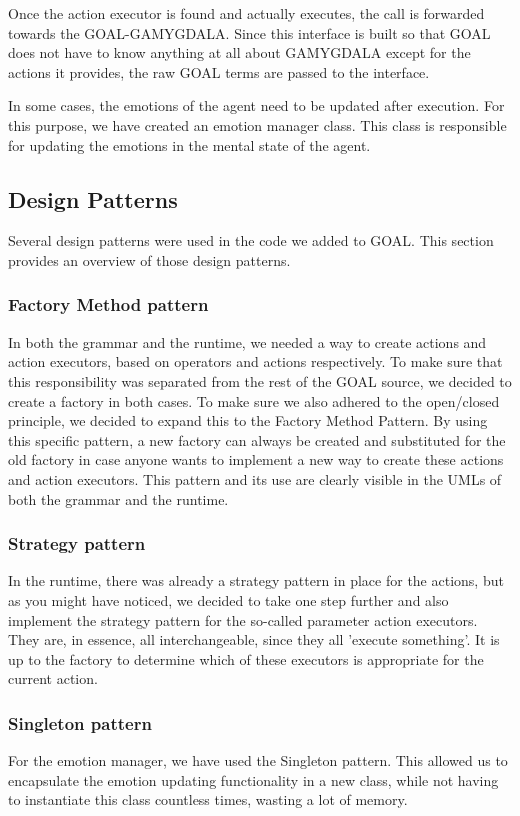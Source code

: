Once the action executor is found and actually executes, the call is forwarded towards the GOAL-GAMYGDALA. Since this interface is built so that GOAL does not have to know anything at all about GAMYGDALA except for the actions it provides, the raw GOAL terms are passed to the interface.

In some cases, the emotions of the agent need to be updated after execution. For this purpose, we have created an emotion manager class. This class is responsible for updating the emotions in the mental state of the agent.

\subsection{Design Patterns}
Several design patterns were used in the code we added to GOAL. This section provides an overview of those design patterns.

\subsubsection{Factory Method pattern}
In both the grammar and the runtime, we needed a way to create actions and action executors, based on operators and actions respectively. To make sure that this responsibility was separated from the rest of the GOAL source, we decided to create a factory in both cases. To make sure we also adhered to the open/closed principle, we decided to expand this to the Factory Method Pattern. By using this specific pattern, a new factory can always be created and substituted for the old factory in case anyone wants to implement a new way to create these actions and action executors. This pattern and its use are clearly visible in the UMLs of both the grammar and the runtime.

\subsubsection{Strategy pattern}
In the runtime, there was already a strategy pattern in place for the actions, but as you might have noticed, we decided to take one step further and also implement the strategy pattern for the so-called parameter action executors. They are, in essence, all interchangeable, since they all 'execute something'. It is up to the factory to determine which of these executors is appropriate for the current action.

\subsubsection{Singleton pattern}
For the emotion manager, we have used the Singleton pattern. This allowed us to encapsulate the emotion updating functionality in a new class, while not having to instantiate this class countless times, wasting a lot of memory.

